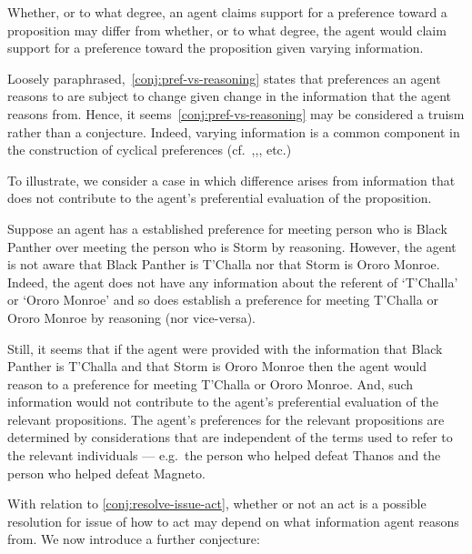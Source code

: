\begin{note}
  \begin{conjecture}\label{conj:pref-vs-reasoning}
    Whether, or to what degree, an agent claims support for a preference toward a proposition may differ from whether, or to what degree, the agent would claim support for a preference toward the proposition given varying information.
  \end{conjecture}

  Loosely paraphrased,~\autoref{conj:pref-vs-reasoning} states that preferences an agent reasons to are subject to change given change in the information that the agent reasons from.
  Hence, it seems~\autoref{conj:pref-vs-reasoning} may be considered a truism rather than a conjecture.
  Indeed, varying information is a common component in the construction of cyclical preferences (cf.\ \cite{Sobel:1997wt},\cite{Schumm:1987wx},\cite{Davidson:1955wo}, etc.)

  To illustrate, we consider a case in which difference arises from information that does not contribute to the agent's preferential evaluation of the proposition.

  Suppose an agent has a established preference for meeting person who is Black Panther over meeting the person who is Storm by reasoning.
  However, the agent is not aware that Black Panther is T'Challa nor that Storm is Ororo Monroe.
  Indeed, the agent does not have any information about the referent of `T'Challa' or `Ororo Monroe' and so does establish a preference for meeting T'Challa or Ororo Monroe by reasoning (nor vice-versa).

  Still, it seems that if the agent were provided with the information that Black Panther is T'Challa and that Storm is Ororo Monroe then the agent would reason to a preference for meeting T'Challa or Ororo Monroe.
  And, such information would not contribute to the agent's preferential evaluation of the relevant propositions.
  The agent's preferences for the relevant propositions are determined by considerations that are independent of the terms used to refer to the relevant individuals --- e.g.\ the person who helped defeat Thanos and the person who helped defeat Magneto.

  With relation to \autoref{conj:resolve-issue-act}, whether or not an act is a possible resolution for issue of how to act may depend on what information agent reasons from.
  We now introduce a further conjecture:


\end{note}
